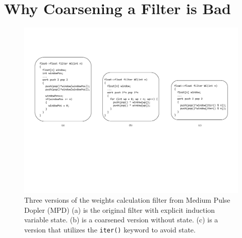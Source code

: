 \section{Why Coarsening a Filter is Bad}
\label{sec:coarsen}







\begin{figure}[t!]
\centering
\includegraphics[width=6.5in]{figures/weights-calc-example.pdf}
\caption{Three versions of the weights calculation filter from Medium Pulse Dopler (MPD) (a) is the original filter with explicit induction variable state.  (b) is a coarsened version without state. (c) is a version that utilizes the {\tt iter()} keyword to avoid state.\protect\label{fig:wc-example}}
\end{figure}


